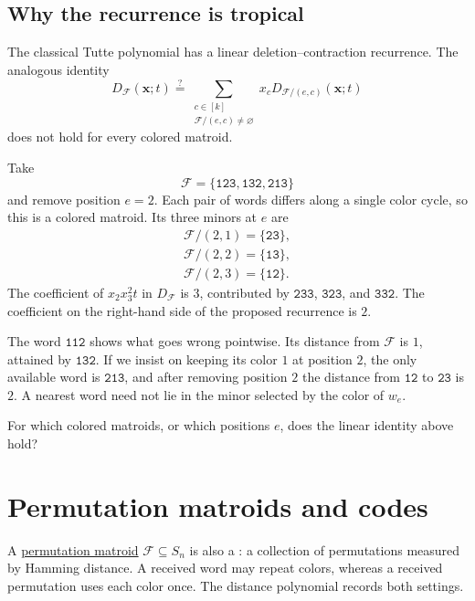 \subsection[linearRecurrence]{Why the recurrence is tropical}

The classical Tutte polynomial has a linear deletion--contraction recurrence.
The analogous identity
\[
 D_{\mathcal F}(\mathbf x;t)
 \stackrel{?}{=}
 \sum_{\substack{c\in[k]\\\mathcal F/(e,c)\ne\varnothing}}
 x_cD_{\mathcal F/(e,c)}(\mathbf x;t)
\]
does not hold for every colored matroid.

\begin{example}
Take
\[
 \mathcal F=\{\mathtt{123},\mathtt{132},\mathtt{213}\}
\]
and remove position $e=2$. Each pair of words differs along a single color
cycle, so this is a colored matroid. Its three minors at $e$ are
\[
 \begin{gathered}
 \mathcal F/(2,1)=\{\mathtt{23}\},\\
 \mathcal F/(2,2)=\{\mathtt{13}\},\\
 \mathcal F/(2,3)=\{\mathtt{12}\}.
 \end{gathered}
\]
The coefficient of $x_2x_3^2t$ in $D_{\mathcal F}$ is $3$, contributed by
$\mathtt{233}$, $\mathtt{323}$, and $\mathtt{332}$. The coefficient on the
right-hand side of the proposed recurrence is $2$.

The word $\mathtt{112}$ shows what goes wrong pointwise. Its distance from
$\mathcal F$ is $1$, attained by $\mathtt{132}$. If we insist on keeping its
color $1$ at position $2$, the only available word is $\mathtt{213}$, and
after removing position $2$ the distance from $\mathtt{12}$ to
$\mathtt{23}$ is $2$. A nearest word need not lie in the minor selected by
the color of $w_e$.
\end{example}

\begin{question}
For which colored matroids, or which positions $e$, does the linear identity
above hold?
\end{question}

\section[permutationDistances]{Permutation matroids and codes}

A \href{permutations.htm}{permutation matroid} $\mathcal F\subseteq S_n$
is also a : a collection of permutations measured by
Hamming distance. A received word may repeat colors, whereas a received
permutation uses each color once. The distance polynomial records both
settings.

